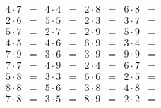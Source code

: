 \documentclass[14pt, a4paper]{extarticle}
\begin{document}
\begin{align*}
4\cdot7&= & 4\cdot4&= & 2\cdot8&= & 6\cdot8&=\\
2\cdot6&= & 5\cdot5&= & 2\cdot3&= & 3\cdot7&=\\
5\cdot7&= & 2\cdot7&= & 2\cdot9&= & 5\cdot9&=\\
4\cdot5&= & 4\cdot6&= & 6\cdot9&= & 3\cdot4&=\\
7\cdot9&= & 3\cdot6&= & 3\cdot9&= & 9\cdot9&=\\
7\cdot7&= & 4\cdot9&= & 2\cdot4&= & 6\cdot7&=\\
5\cdot8&= & 3\cdot3&= & 6\cdot6&= & 2\cdot5&=\\
8\cdot8&= & 5\cdot6&= & 3\cdot8&= & 4\cdot8&=\\
7\cdot8&= & 3\cdot5&= & 8\cdot9&= & 2\cdot2&=
\end{align*}
\end{document}
